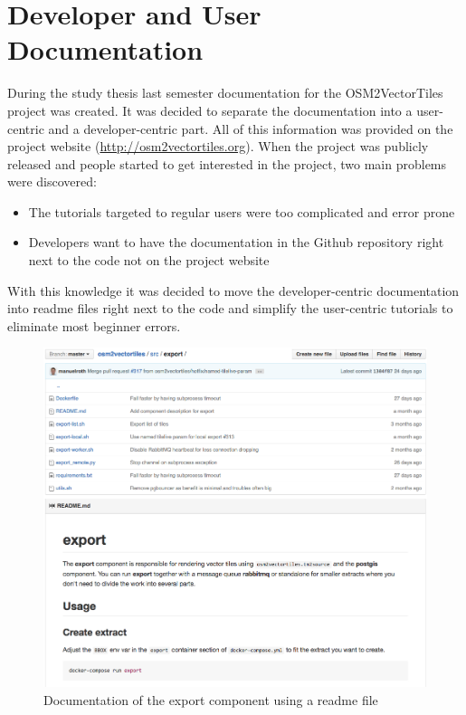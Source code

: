 \chapter{Developer and User Documentation}

During the study thesis last semester documentation for the OSM2VectorTiles project was created. It was decided to separate the documentation into a user-centric and a developer-centric part. All of this information was provided on the project website (\url{http://osm2vectortiles.org}). When the project was publicly released and people started to get interested in the project, two main problems were discovered:

\begin{itemize}
    \item The tutorials targeted to regular users were too complicated and error prone
    \item Developers want to have the documentation in the Github repository right next to the code not on the project website
\end{itemize}

With this knowledge it was decided to move the developer-centric documentation into readme files right next to the code and simplify the user-centric tutorials to eliminate most beginner errors.

\begin{figure}[H]
  \centering
  \includegraphics[width=1.0\textwidth]{images/documentation/developer_documentation}
  \caption{Documentation of the export component using a readme file}
  \label{developer_documentation}
\end{figure}

